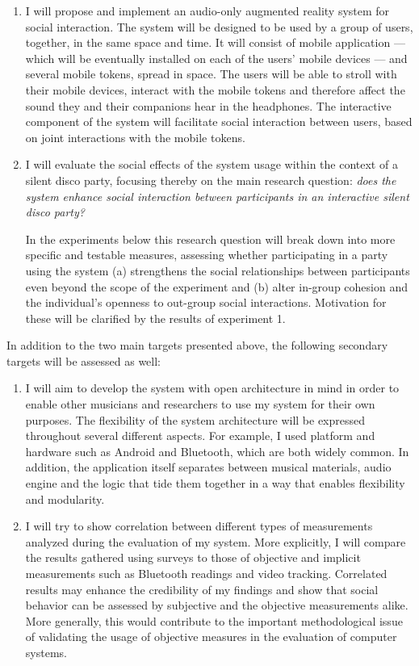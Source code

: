 \documentclass[a4paper,11pt]{article}
\begin{document}
\begin{enumerate}[resume]
    \item I will propose and implement an audio-only augmented reality system for social interaction.
          The system will be designed to be used by a group of users, together, in the same space and time.
          It will consist of mobile application --- which will be eventually installed on each of the users' mobile devices --- and several mobile tokens, spread in space.
          The users will be able to stroll with their mobile devices, interact with the mobile tokens and therefore affect the sound they and their companions hear in the headphones.
          The interactive component of the system will facilitate social interaction between users, based on joint interactions with the mobile tokens.

    \item I will evaluate the social effects of the system usage within the context of a silent disco party, focusing thereby on the main research question: \emph{does the system enhance social interaction between participants in an interactive silent disco party?}

          In the experiments below this research question will break down into more specific and testable measures, assessing whether participating in a party using the system (a) strengthens the social relationships between participants even beyond the scope of the experiment and (b) alter in-group cohesion and the individual's openness to out-group social interactions.
          Motivation for these will be clarified by the results of experiment 1.
\end{enumerate}

In addition to the two main targets presented above, the following secondary targets will be assessed as well:

\begin{enumerate}[resume]
    \item I will aim to develop the system with open architecture in mind in order to enable other musicians and researchers to use my system for their own purposes.
          The flexibility of the system architecture will be expressed throughout several different aspects.
          For example, I used platform and hardware such as Android and Bluetooth, which are both widely common.
          In addition, the application itself separates between musical materials, audio engine and the logic that tide them together in a way that enables flexibility and modularity.
    \item I will try to show correlation between different types of measurements analyzed during the evaluation of my system.
          More explicitly, I will compare the results gathered using surveys to those of objective and implicit measurements such as Bluetooth readings and video tracking.
          Correlated results may enhance the credibility of my findings and show that social behavior can be assessed by subjective and the objective measurements alike.
          More generally, this would contribute to the important methodological issue of validating the usage of objective measures in the evaluation of computer systems.
\end{enumerate}
\end{document}
